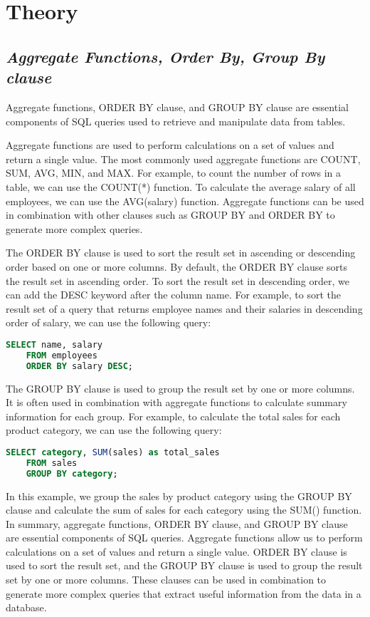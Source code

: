 \documentclass{article}
\begin{document}
\section{\textbf{Theory}}
\subsection{\textit{Aggregate Functions, Order By, Group By clause}}
Aggregate functions, ORDER BY clause, and GROUP BY clause are essential components of SQL queries used to retrieve and manipulate data from tables.

Aggregate functions are used to perform calculations on a set of values and return a single value. The most commonly used aggregate functions are COUNT, SUM, AVG, MIN, and MAX. For example, to count the number of rows in a table, we can use the COUNT(*) function. To calculate the average salary of all employees, we can use the AVG(salary) function. Aggregate functions can be used in combination with other clauses such as GROUP BY and ORDER BY to generate more complex queries.

The ORDER BY clause is used to sort the result set in ascending or descending order based on one or more columns. By default, the ORDER BY clause sorts the result set in ascending order. To sort the result set in descending order, we can add the DESC keyword after the column name. For example, to sort the result set of a query that returns employee names and their salaries in descending order of salary, we can use the following query:
\begin{lstlisting}[language=SQL]
    SELECT name, salary
    FROM employees
    ORDER BY salary DESC;
\end{lstlisting}
The GROUP BY clause is used to group the result set by one or more columns. It is often used in combination with aggregate functions to calculate summary information for each group. For example, to calculate the total sales for each product category, we can use the following query:
\begin{lstlisting}[language=SQL]
    SELECT category, SUM(sales) as total_sales
    FROM sales
    GROUP BY category;

\end{lstlisting}
In this example, we group the sales by product category using the GROUP BY clause and calculate the sum of sales for each category using the SUM() function.\\

In summary, aggregate functions, ORDER BY clause, and GROUP BY clause are essential components of SQL queries. Aggregate functions allow us to perform calculations on a set of values and return a single value. ORDER BY clause is used to sort the result set, and the GROUP BY clause is used to group the result set by one or more columns. These clauses can be used in combination to generate more complex queries that extract useful information from the data in a database.
\end{document}
